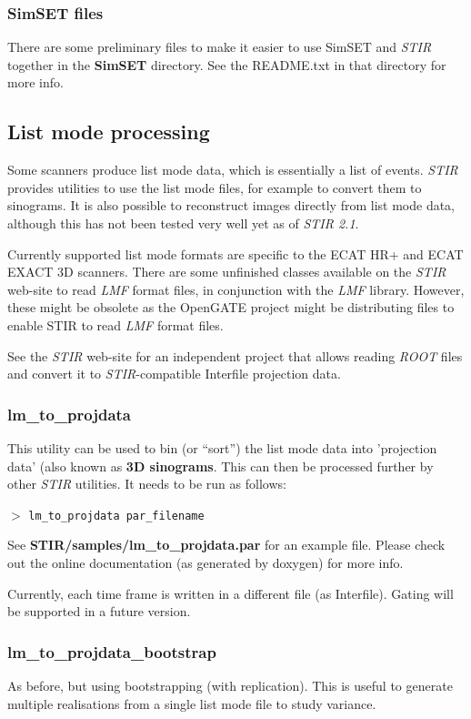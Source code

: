 \documentclass{article}
\newcommand{\cmdline}[1]{\par \noindent $>$ \texttt{#1}\par}
\begin{document}
\subsubsection{SimSET files}
There are some preliminary files to make it easier to use SimSET and \textit{STIR} together in the
\textbf{SimSET} directory. See the README.txt in that directory for more info.

\subsection{
List mode processing}

Some scanners produce list mode data, which is essentially a 
list of events.  \textit{STIR} provides utilities to use
the list mode files, for example to convert them to sinograms. It is
also possible to reconstruct images directly from list mode data, although
this has not been tested very well yet as of \textit{STIR 2.1}.

Currently supported list mode formats are specific to the ECAT 
HR+ and ECAT EXACT 3D scanners. There are some unfinished classes
available on the \textit{STIR} web-site to read \textit{LMF} format files,
in conjunction with the \textit{LMF} library. However, these might be obsolete
as the OpenGATE project might be distributing files
to enable STIR to read \textit{LMF} format files.

See the \textit{STIR} web-site for an independent project that allows reading
\textit{ROOT} files and convert it to \textit{STIR}-compatible Interfile projection data.

\subsubsection{
lm\_to\_projdata}

This utility can be used to bin (or ``sort'') the list mode data 
into 'projection data' (also known as \textbf{3D sinograms}. 
This can then be processed further by other \textit{STIR} utilities. It 
needs to be run as follows:

\cmdline{lm\_to\_projdata par\_filename}


See \textbf{STIR/samples/lm\_to\_projdata.par} for an example file. Please 
check out the online documentation (as generated by doxygen) 
for more info.

Currently, each time frame is written in a different file (as Interfile). Gating 
will be supported in a future version.

\subsubsection{
lm\_to\_projdata\_bootstrap}
As before, but using bootstrapping (with replication). This is useful to generate multiple realisations 
from a single list mode file to study variance.
\end{document}
